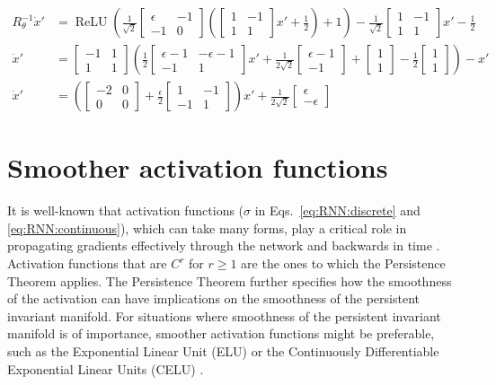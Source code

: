 \documentclass{article} %
\newcounter{ct}
\theoremstyle{definition}
\theoremstyle{remark}
\begin{document}
\begin{align}
R_{\theta}^{-1}\dot x' &= \operatorname{ReLU}\left(\frac{1}{\sqrt{2}}\begin{bmatrix}\epsilon &-1\\-1&0\end{bmatrix}\left(\begin{bmatrix}1 &-1\\1&1\end{bmatrix} x'+\frac{1}{2}\right)+1\right)-\frac{1}{\sqrt{2}}\begin{bmatrix}1 &-1\\1&1\end{bmatrix} x'-\frac{1}{2}\\
\dot x' &=\begin{bmatrix}-1 &1\\1&1\end{bmatrix}\left(\frac{1}{2}\begin{bmatrix}\epsilon-1 &-\epsilon-1\\-1&1\end{bmatrix}x' + \frac{1}{2\sqrt{2}}\begin{bmatrix}\epsilon-1 \\-1\end{bmatrix}+\begin{bmatrix}1 \\1\end{bmatrix}-\frac{1}{2}\begin{bmatrix}1 \\1\end{bmatrix}\right)-x'\\
\dot x' &=\left(\begin{bmatrix}-2 &0\\0&0\end{bmatrix}+\frac{\epsilon}{2}\begin{bmatrix}1 &-1\\-1&1\end{bmatrix}\right)x' + \frac{1}{2\sqrt{2}}\begin{bmatrix}\epsilon \\-\epsilon\end{bmatrix}
\end{align}

\section{Smoother activation functions}
It is well-known that activation functions ($\sigma$ in  Eqs.~\ref{eq:RNN:discrete} and  \ref{eq:RNN:continuous}), which can take many forms, play a critical role in propagating gradients effectively through the network and backwards in time \citep{jagtap2023,ramachandran2017,hayou2019}.
Activation functions that are $C^r$ for $r\geq 1$ are the ones to which the Persistence Theorem applies. 
The Persistence Theorem further specifies how the smoothness of the activation can have implications on the smoothness of the persistent invariant manifold.
For situations where smoothness of the persistent invariant manifold is of importance, smoother activation functions might be preferable, such as the Exponential Linear Unit (ELU)\citep{clevert2015} or the Continuously Differentiable Exponential Linear Units (CELU) \citep{barron2017}.
\end{document}
